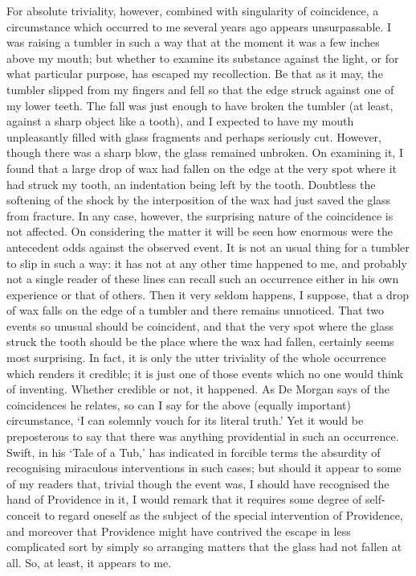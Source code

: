 \documentclass[letterpaper,12pt,oneside,openany]{memoir}
\begin{document}
For absolute triviality, however, combined with singularity
of coincidence, a circumstance which occurred
to me several years ago appears unsurpassable. I was
raising a tumbler in such a way that at the moment
it was a few inches above my mouth; but whether to
examine its substance against the light, or for what
particular purpose, has escaped my recollection. Be
that as it may, the tumbler slipped from my fingers
and fell so that the edge struck against one of my
lower teeth. The fall was just enough to have broken
the tumbler (at least, against a sharp object like a
tooth), and I expected to have my mouth unpleasantly
filled with glass fragments and perhaps seriously cut.
However, though there was a sharp blow, the glass remained
unbroken. On examining it, I found that a
large drop of wax had fallen on the edge at the very
spot where it had struck my tooth, an indentation being
left by the tooth. Doubtless the softening of the shock
by the interposition of the wax had just saved the glass
from fracture. In any case, however, the surprising
nature of the coincidence is not affected. On considering
the matter it will be seen how enormous were
the antecedent odds against the observed event. It is
not an usual thing for a tumbler to slip in such a
way: it has not at any other time happened to me,
and probably not a single reader of these lines can
recall such an occurrence either in his own experience
or that of others. Then it very seldom happens,
I suppose, that a drop of wax falls on the edge of a
tumbler and there remains unnoticed. That two
events so unusual should be coincident, and that the
very spot where the glass struck the tooth should be
the place where the wax had fallen, certainly seems
most surprising. In fact, it is only the utter triviality
of the whole occurrence which renders it credible; it is
just one of those events which no one would think of
inventing. Whether credible or not, it happened. As
De Morgan says of the coincidences he relates, so
can I say for the above (equally important) circumstance,
`I can solemnly vouch for its literal truth.'
Yet it would be preposterous to say that there was
anything providential in such an occurrence. Swift,
in his `Tale of a Tub,' has indicated in forcible terms
the absurdity of recognising miraculous interventions
in such cases; but should it appear to some of
my readers that, trivial though the event was, I
should have recognised the hand of Providence in it,
I would remark that it requires some degree of self-conceit
to regard oneself as the subject of the special
intervention of Providence, and moreover that Providence
might have contrived the escape in less complicated
sort by simply so arranging matters that the
glass had not fallen at all. So, at least, it appears to
me.
\end{document}
